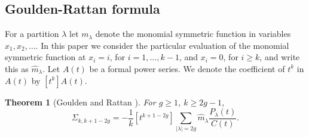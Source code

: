 \documentclass[12pt]{amsart}
\theoremstyle{plain}
\newtheorem{theorem}[lemma]{Theorem}
\theoremstyle{remark}
\begin{document}
% 




\subsection{Goulden-Rattan formula}

\label{sec:Goulden-Rattan}
For a partition $\lambda$ let $m_{\lambda}$ denote the monomial symmetric
function in
variables $x_1,x_2,\dots$. In
this paper we consider the particular evaluation of the monomial
symmetric function at $x_i=i$, for $i=1,\dots ,k-1$, and $x_i=0$,
for $i\geq k$, and write this as $\hat{m}_{\lambda}$. Let $A(t)$ be a formal
power series. We denote the coefficient of $t^k$ in $A(t)$ by $[t^k]A(t)$. 



\begin{theorem}[Goulden and Rattan \cite{GouldenRattan2007}]
\label{theo:g-r}
For $g\geq 1$, $k\geq 2g-1$,
\begin{equation}
\label{eq:G-R}
\Sigma_{k,k+1-2g}=-\frac{1}{k}[t^{k+1-2g}]
\sum_{|\lambda| = 2g}\hat{m}_{\lambda}
\frac{P_{\lambda}(t)}{C(t)}.
\end{equation}
\end{theorem}

%
\end{document}
